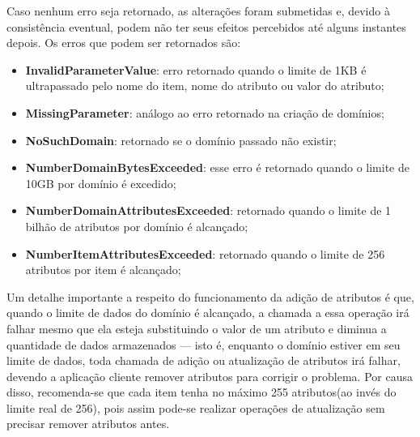 Caso nenhum erro seja retornado, as alterações foram submetidas e, devido à consistência eventual, podem não ter seus efeitos percebidos até alguns instantes depois. Os erros que podem ser retornados são:
\\
\begin{itemize}
	\item \textbf{InvalidParameterValue}: erro retornado quando o limite de 1KB é ultrapassado pelo nome do item, nome do atributo ou valor do atributo;
	\item \textbf{MissingParameter}: análogo ao erro retornado na criação de domínios;
	\item \textbf{NoSuchDomain}: retornado se o domínio passado não existir;
	\item \textbf{NumberDomainBytesExceeded}: esse erro é retornado quando o limite de 10GB por domínio é excedido;
	\item \textbf{NumberDomainAttributesExceeded}: retornado quando o limite de 1 bilhão de atributos por domínio é alcançado;
	\item \textbf{NumberItemAttributesExceeded}: retornado quando o limite de 256 atributos por item é alcançado;
\end{itemize}

Um detalhe importante a respeito do funcionamento da adição de atributos é que, quando o limite de dados do domínio é alcançado, a chamada a essa operação irá falhar mesmo que ela esteja substituindo o valor de um atributo e diminua a quantidade de dados armazenados --- isto é, enquanto o domínio estiver em seu limite de dados, toda chamada de adição ou atualização de atributos irá falhar, devendo a aplicação cliente remover atributos para corrigir o problema. Por causa disso, recomenda-se que cada item tenha no máximo 255 atributos(ao invés do limite real de 256), pois assim pode-se realizar operações de atualização sem precisar remover atributos antes.

